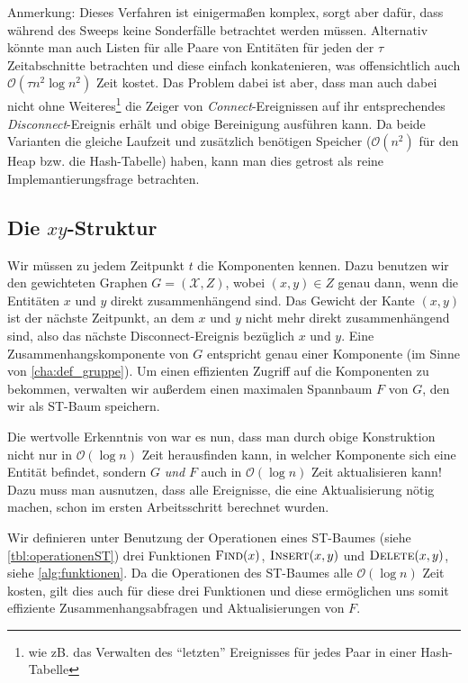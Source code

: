 Anmerkung: Dieses Verfahren ist einigermaßen komplex, sorgt aber dafür, dass während des Sweeps keine Sonderfälle betrachtet werden müssen.
Alternativ könnte man auch Listen für alle Paare von Entitäten für jeden der $\tau$ Zeitabschnitte betrachten und diese einfach konkatenieren, was offensichtlich auch $\mathcal{O}(\tau n^2 \log n^2)$ Zeit kostet.
Das Problem dabei ist aber, dass man auch dabei nicht ohne Weiteres\footnote{wie zB. das Verwalten des \enquote{letzten} Ereignisses für jedes Paar in einer Hash-Tabelle} die Zeiger von \emph{Connect}-Ereignissen auf ihr entsprechendes \emph{Disconnect}-Ereignis erhält und obige Bereinigung ausführen kann.
Da beide Varianten die gleiche Laufzeit und zusätzlich benötigen Speicher ($\mathcal{O}(n^2)$ für den Heap bzw. die Hash-Tabelle) haben, kann man dies getrost als reine Implemantierungsfrage betrachten.

\subsection{Die $xy$-Struktur} %
\label{sub:xy_struktur}
Wir müssen zu jedem Zeitpunkt $t$ die Komponenten kennen.
Dazu benutzen wir den gewichteten Graphen $G=(\mathcal{X},Z)$, wobei $(x,y) \in Z$ genau dann, wenn die Entitäten $x$ und $y$ direkt zusammenhängend sind.
Das Gewicht der Kante $(x,y)$ ist der nächste Zeitpunkt, an dem $x$ und $y$ nicht mehr direkt zusammenhängend sind, also das nächste Disconnect-Ereignis bezüglich $x$ und $y$.
Eine Zusammenhangskomponente von $G$ entspricht genau einer Komponente (im Sinne von \cref{cha:def_gruppe}).
Um einen effizienten Zugriff auf die Komponenten zu bekommen, verwalten wir außerdem einen maximalen Spannbaum $F$ von $G$, den wir als ST-Baum speichern.

Die wertvolle Erkenntnis von \textcite{parsaReeb} war es nun, dass man durch obige Konstruktion nicht nur in $\mathcal{O}(\log n)$ Zeit herausfinden kann, in welcher Komponente sich eine Entität befindet, sondern $G$ \emph{und} $F$ auch in $\mathcal{O}(\log n)$ Zeit aktualisieren kann!
Dazu muss man ausnutzen, dass alle Ereignisse, die eine Aktualisierung nötig machen, schon im ersten Arbeitsschritt berechnet wurden.

Wir definieren unter Benutzung der Operationen eines ST-Baumes (siehe \cref{tbl:operationenST}) drei Funktionen $\textsc{Find}(x)$, $\textsc{Insert}(x,y)$ und $\textsc{Delete}(x,y)$, siehe \cref{alg:funktionen}.
Da die Operationen des ST-Baumes alle $\mathcal{O}(\log n)$ Zeit kosten, gilt dies auch für diese drei Funktionen und diese ermöglichen uns somit effiziente Zusammenhangsabfragen und Aktualisierungen von $F$.

